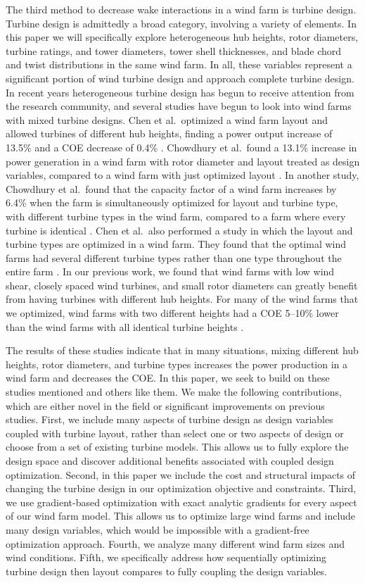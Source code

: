 The third method to decrease wake interactions in a wind farm is turbine design. Turbine design is admittedly a broad category, involving a variety of elements. In this paper we will specifically explore heterogeneous hub heights, rotor diameters, turbine ratings, and tower diameters, tower shell thicknesses, and blade chord and twist distributions in the same wind farm. In all, these variables represent a significant portion of wind turbine design and approach complete turbine design. 
In recent years heterogeneous turbine design has begun to receive attention from the research community, and several studies have begun to look into wind farms with mixed turbine designs. Chen et al.~optimized
a wind farm layout and allowed turbines of different hub heights, finding a power output increase of 13.5\% and a COE decrease of 0.4\% \citep{chen2013wind}. Chowdhury et al.~found
a 13.1\% increase in power generation in a wind farm with rotor diameter and layout treated as design variables, compared to a wind farm with just optimized layout \citep{chowdhury2010optimizing}. In another study, Chowdhury et al.~found that the capacity factor of a wind farm increases by 6.4\% when the farm is simultaneously optimized for layout and turbine type, with different turbine types in the wind farm, compared to a farm where every turbine is identical \citep{chowdhury2013optimizing}. Chen et al.~also performed a study in which the layout and turbine types are optimized in a wind farm. They found that the optimal wind farms had several different turbine types rather than one type throughout the entire farm \citep{chen2015multi}. In our previous work, we found that wind farms with low wind shear, closely spaced wind turbines, and small rotor diameters can greatly benefit from having turbines with different hub heights. For many of the wind farms that we optimized, wind farms with two different heights had a COE 5--10\% lower than the wind farms with all identical turbine heights \citep{stanley2018}.

The results of these studies indicate that in many situations, mixing different hub heights, rotor diameters, and turbine types increases the power production in a wind farm and decreases the COE. In this paper, we seek to build on these studies mentioned and others like them.
We make the following contributions, which are either novel in the field or significant improvements on previous studies.
First, we include many aspects of turbine design as design variables coupled with turbine layout, rather than select one or two aspects of design or choose from a set of existing turbine models. This allows us to fully explore the design space and discover additional benefits associated with coupled design optimization.
Second, in this paper we include the cost and structural impacts of changing the turbine design in our optimization objective and constraints.
Third, we use gradient-based optimization with exact analytic gradients for every aspect of our wind farm model. This allows us to optimize large wind farms and include many design variables, which would be impossible with a gradient-free optimization approach.
Fourth, we analyze many different wind farm sizes and wind conditions.
Fifth, we specifically address how sequentially optimizing turbine design then layout compares to fully coupling the design variables.